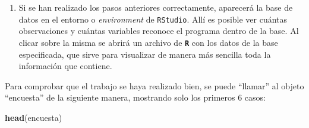 \documentclass[
]{article}
\newenvironment{Shaded}{\begin{snugshade}}{\end{snugshade}}
\newcommand{\FunctionTok}[1]{\textcolor[rgb]{0.13,0.29,0.53}{\textbf{#1}}}
\newcommand{\NormalTok}[1]{#1}
\providecommand{\tightlist}{%
  \setlength{\itemsep}{0pt}\setlength{\parskip}{0pt}}
\begin{document}
\begin{enumerate}
\def\labelenumi{\arabic{enumi}.}
\setcounter{enumi}{4}
\tightlist
\item
  Si se han realizado los pasos anteriores correctamente, aparecerá la base de datos en el entorno o \emph{environment} de \texttt{RStudio}. Allí es posible ver cuántas observaciones y cuántas variables reconoce el programa dentro de la base. Al clicar sobre la misma se abrirá un archivo de \textbf{\texttt{R}} con los datos de la base especificada, que sirve para visualizar de manera más sencilla toda la información que contiene.
\end{enumerate}

Para comprobar que el trabajo se haya realizado bien, se puede ``llamar'' al objeto ``encuesta'' de la siguiente manera, mostrando solo los primeros 6 casos:

\begin{Shaded}
\begin{Highlighting}[]
\FunctionTok{head}\NormalTok{(encuesta)}
\end{Highlighting}
\end{Shaded}

 
  \providecommand{\huxb}[2]{\arrayrulecolor[RGB]{#1}\global\arrayrulewidth=#2pt}
  \providecommand{\huxvb}[2]{\color[RGB]{#1}\vrule width #2pt}
  \providecommand{\huxtpad}[1]{\rule{0pt}{#1}}
  \providecommand{\huxbpad}[1]{\rule[-#1]{0pt}{#1}}
\end{document}
